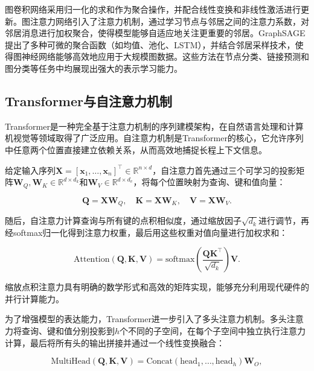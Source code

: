 \documentclass[a4paper,10pt]{article}
\begin{document}
图卷积网络采用归一化的求和作为聚合操作，并配合线性变换和非线性激活进行更新。图注意力网络引入了注意力机制，通过学习节点与邻居之间的注意力系数，对邻居消息进行加权聚合，使得模型能够自适应地关注更重要的邻居。GraphSAGE提出了多种可微的聚合函数（如均值、池化、LSTM），并结合邻居采样技术，使得图神经网络能够高效地应用于大规模图数据。这些方法在节点分类、链接预测和图分类等任务中均展现出强大的表示学习能力。

\subsection{Transformer与自注意力机制}

Transformer是一种完全基于注意力机制的序列建模架构，在自然语言处理和计算机视觉等领域取得了广泛应用。自注意力机制是Transformer的核心，它允许序列中任意两个位置直接建立依赖关系，从而高效地捕捉长程上下文信息。

给定输入序列$\mathbf{X}=[\mathbf{x}_1,\dots,\mathbf{x}_n]^\top\in\mathbb{R}^{n\times d}$，自注意力首先通过三个可学习的投影矩阵$\mathbf{W}_Q,\mathbf{W}_K\in\mathbb{R}^{d\times d_k}$和$\mathbf{W}_V\in\mathbb{R}^{d\times d_v}$，将每个位置映射为查询、键和值向量：

\begin{equation}
\mathbf{Q}=\mathbf{X}\mathbf{W}_Q,\quad \mathbf{K}=\mathbf{X}\mathbf{W}_K,\quad \mathbf{V}=\mathbf{X}\mathbf{W}_V.
\end{equation}

随后，自注意力计算查询与所有键的点积相似度，通过缩放因子$\sqrt{d_k}$进行调节，再经softmax归一化得到注意力权重，最后用这些权重对值向量进行加权求和：

\begin{equation}
\text{Attention}(\mathbf{Q},\mathbf{K},\mathbf{V})=\text{softmax}\left(\frac{\mathbf{Q}\mathbf{K}^\top}{\sqrt{d_k}}\right)\mathbf{V}.
\end{equation}

缩放点积注意力具有明确的数学形式和高效的矩阵实现，能够充分利用现代硬件的并行计算能力。

为了增强模型的表达能力，Transformer进一步引入了多头注意力机制。多头注意力将查询、键和值分别投影到$h$个不同的子空间，在每个子空间中独立执行注意力计算，最后将所有头的输出拼接并通过一个线性变换融合：

\begin{equation}
\text{MultiHead}(\mathbf{Q},\mathbf{K},\mathbf{V})=\text{Concat}(\text{head}_1,\dots,\text{head}_h)\mathbf{W}_O,
\end{equation}
\end{document}

